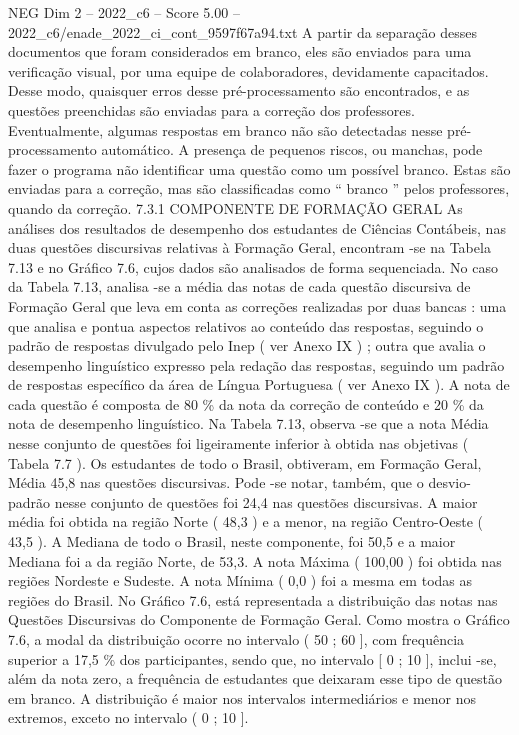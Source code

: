 \begin{textsample}{NEG Dim 2 – 2022\_c6 – Score 5.00 – 2022\_c6/enade\_2022\_ci\_cont\_9597f67a94.txt}
A partir da separação desses documentos que foram considerados em branco, eles são enviados para uma verificação visual, por uma equipe de colaboradores, devidamente capacitados.
Desse modo, quaisquer erros desse pré-processamento são encontrados, e as questões preenchidas são enviadas para a correção dos professores.
Eventualmente, algumas respostas em branco não são detectadas nesse pré-processamento automático.
A presença de pequenos riscos, ou manchas, pode fazer o programa não identificar uma questão como um possível branco.
Estas são enviadas para a correção, mas são classificadas como “ branco ” pelos professores, quando da correção. 7.3.1 COMPONENTE DE FORMAÇÃO GERAL As análises dos resultados de desempenho dos estudantes de Ciências Contábeis, nas duas questões discursivas relativas à Formação Geral, encontram -se na Tabela 7.13 e no Gráfico 7.6, cujos dados são analisados de forma sequenciada.
No caso da Tabela 7.13, analisa -se a média das notas de cada questão discursiva de Formação Geral que leva em conta as correções realizadas por duas bancas : uma que analisa e pontua aspectos relativos ao conteúdo das respostas, seguindo o padrão de respostas divulgado pelo Inep ( ver Anexo IX ) ; outra que avalia o desempenho linguístico expresso pela redação das respostas, seguindo um padrão de respostas específico da área de Língua Portuguesa ( ver Anexo IX ).
A nota de cada questão é composta de 80 \% da nota da correção de conteúdo e 20 \% da nota de desempenho linguístico.
Na Tabela 7.13, observa -se que a nota Média nesse conjunto de questões foi ligeiramente inferior à obtida nas objetivas ( Tabela 7.7 ).
Os estudantes de todo o Brasil, obtiveram, em Formação Geral, Média 45,8 nas questões discursivas.
Pode -se notar, também, que o desvio-padrão nesse conjunto de questões foi 24,4 nas questões discursivas.
A maior média foi obtida na região Norte ( 48,3 ) e a menor, na região Centro-Oeste ( 43,5 ).
A Mediana de todo o Brasil, neste componente, foi 50,5 e a maior Mediana foi a da região Norte, de 53,3.
A nota Máxima ( 100,00 ) foi obtida nas regiões Nordeste e Sudeste.
A nota Mínima ( 0,0 ) foi a mesma em todas as regiões do Brasil.
No Gráfico 7.6, está representada a distribuição das notas nas Questões Discursivas do Componente de Formação Geral.
Como mostra o Gráfico 7.6, a modal da distribuição ocorre no intervalo ( 50 ; 60 ], com frequência superior a 17,5 \% dos participantes, sendo que, no intervalo [ 0 ; 10 ], inclui -se, além da nota zero, a frequência de estudantes que deixaram esse tipo de questão em branco.
A distribuição é maior nos intervalos intermediários e menor nos extremos, exceto no intervalo ( 0 ; 10 ].

\end{textsample}
